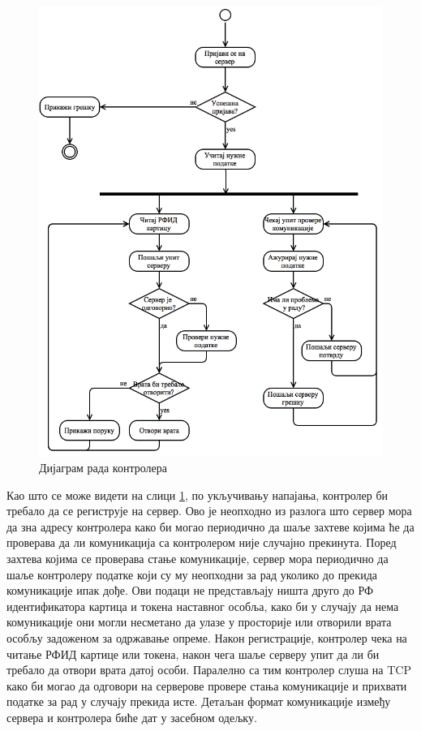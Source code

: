 \documentclass[a4paper, 12pt, diplomski]{etfcyr}
\begin{document}
					\begin{figure}[h]
						\begin{center}
							\includegraphics[scale=0.4]{RoomControllerWorkflow.png}
						\end{center}
						\caption{Дијаграм рада контролера}
						\label{figure:4}
					\end{figure}
					\begin{justify}
						Као што се може видети на слици \ref{figure:4}, по укључивању напајања, контролер би требало да се региструје на сервер. Ово је неопходно из разлога што сервер мора да зна адресу контролера како би могао периодично да шаље захтеве којима ће да проверава да ли комуникација са контролером није случајно прекинута. Поред захтева којима се проверава стање комуникације, сервер мора периодично да шаље контролеру податке који су му неопходни за рад уколико до прекида комуникације ипак дође. Ови подаци не представљају ништа друго до РФ идентификатора картица и токена наставног особља, како би у случају да нема комуникације они могли несметано да улазе у просторије или отворили врата особљу задоженом за одржавање опреме.
						Након регистрације, контролер чека на читање РФИД картице или токена, након чега шаље серверу упит да ли би требало да отвори врата датој особи. Паралелно са тим контролер слуша на TCP како би могао да одговори на серверове провере стања комуникације и прихвати податке за рад у случају прекида исте. Детаљан формат комуникације између сервера и контролера биће дат у засебном одељку.
					\end{justify}
\end{document}
